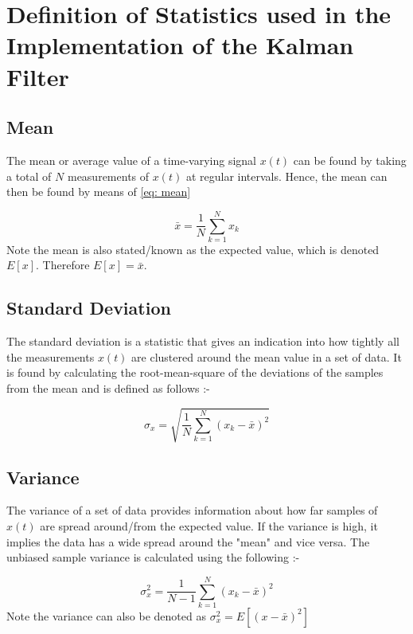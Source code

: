 	\chapter{Definition of Statistics used in the Implementation of the Kalman Filter} \label{chap: statist stuff for kaman}
	\section{Mean}
	The mean or average value of a time-varying signal $x(t)$ can be found by taking a total of $N$ measurements of $x(t)$ at regular intervals. Hence, the mean can then be found by means of \eqref{eq: mean} 
	
	\begin{equation}
	\bar{x} = \frac{1}{N}\sum_{k=1}^{N}x_k
	\label{eq: mean}
	\end{equation}
Note the mean is also stated/known as the expected value, which is denoted $E[x]$. Therefore $E[x] = \bar{x}$.

\section{Standard Deviation}

The standard deviation is a statistic that gives an indication into how tightly all the measurements $x(t)$ are clustered around the mean value in a set of data. It is found by calculating the root-mean-square of the deviations of the samples from the mean and is defined as follows :-

\begin{equation}
\sigma_x = \sqrt{\frac{1}{N} \sum_{k=1}^{N} (x_k - \bar{x})^2}
\end{equation}   	
	
	
	\section{Variance}
	The variance of a set of data provides information about how far samples of $x(t)$ are spread around/from the expected value. If the variance is high, it implies the data has a wide spread around the "mean" and vice versa. The  unbiased sample variance is calculated using the following :-
	
	
	\begin{equation}
	\sigma_x^2 = \frac{1}{N-1} \sum_{k=1}^{N} (x_k - \bar{x})^2
	\end{equation}   	
	Note the variance can also be denoted as $ \sigma_x^2 = E[(x-\bar{x})^2]$
	
